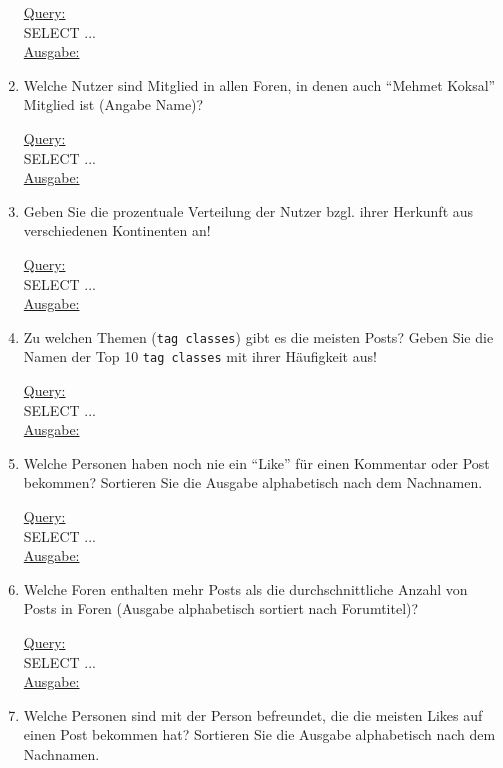 \begin{enumerate}
    \uline{Query:}\\
    SELECT ...\\
    \uline{Ausgabe:}\\

    \item Welche Nutzer sind Mitglied in allen Foren, in denen auch \enquote{Mehmet Koksal} Mitglied ist (Angabe Name)?

    \uline{Query:}\\
    SELECT ...\\
    \uline{Ausgabe:}\\

    \item Geben Sie die prozentuale Verteilung der Nutzer bzgl. ihrer Herkunft aus verschiedenen Kontinenten an!

    \uline{Query:}\\
    SELECT ...\\
    \uline{Ausgabe:}\\

    \item Zu welchen Themen (\texttt{tag classes}) gibt es die meisten Posts? Geben Sie die Namen der Top 10 \texttt{tag classes} mit ihrer Häufigkeit aus!

    \uline{Query:}\\
    SELECT ...\\
    \uline{Ausgabe:}\\

    \item Welche Personen haben noch nie ein \enquote{Like} für einen Kommentar oder Post bekommen? Sortieren Sie die Ausgabe alphabetisch nach dem Nachnamen.

    \uline{Query:}\\
    SELECT ...\\
    \uline{Ausgabe:}\\

    \item Welche Foren enthalten mehr Posts als die durchschnittliche Anzahl von Posts in Foren (Ausgabe alphabetisch sortiert nach Forumtitel)?

    \uline{Query:}\\
    SELECT ...\\
    \uline{Ausgabe:}\\

    \item Welche Personen sind mit der Person befreundet, die die meisten Likes auf einen Post bekommen hat? Sortieren Sie die
    Ausgabe alphabetisch nach dem Nachnamen.


\end{enumerate}
